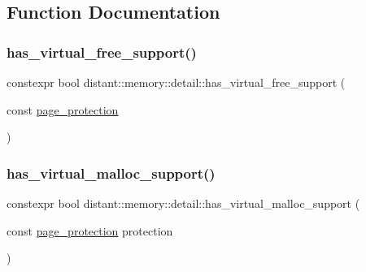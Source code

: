 \subsection{Function Documentation}
\mbox{\label{namespacedistant_1_1memory_1_1detail_ab1b2a08a1b2d006cc554980cdf35122f}} 
\subsubsection{\texorpdfstring{has\+\_\+virtual\+\_\+free\+\_\+support()}{has\_virtual\_free\_support()}}
{\footnotesize\ttfamily constexpr bool distant\+::memory\+::detail\+::has\+\_\+virtual\+\_\+free\+\_\+support (\begin{DoxyParamCaption}\item[{const \mbox{\hyperlink{structdistant_1_1access__rights_a09c6caea8f570f8e2d18c3ef2e2a7804}{page\+\_\+protection}}}]{ }\end{DoxyParamCaption})\hspace{0.3cm}{\ttfamily [noexcept]}}

\mbox{\label{namespacedistant_1_1memory_1_1detail_aedea4bd490e2d4569980ab5ca06fa002}} 
\subsubsection{\texorpdfstring{has\+\_\+virtual\+\_\+malloc\+\_\+support()}{has\_virtual\_malloc\_support()}}
{\footnotesize\ttfamily constexpr bool distant\+::memory\+::detail\+::has\+\_\+virtual\+\_\+malloc\+\_\+support (\begin{DoxyParamCaption}\item[{const \mbox{\hyperlink{structdistant_1_1access__rights_a09c6caea8f570f8e2d18c3ef2e2a7804}{page\+\_\+protection}}}]{protection }\end{DoxyParamCaption})\hspace{0.3cm}{\ttfamily [noexcept]}}


